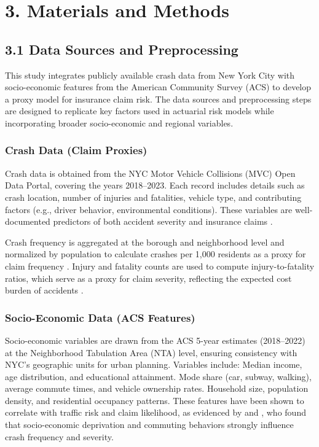 \documentclass[
  number,
  review,
  3p]{elsarticle}
\begin{document}
\section{3. Materials and Methods}\label{materials-and-methods}

\subsection{\texorpdfstring{\textbf{3.1 Data Sources and
Preprocessing}}{3.1 Data Sources and Preprocessing}}\label{data-sources-and-preprocessing}

This study integrates publicly available crash data from New York City
with socio-economic features from the American Community Survey (ACS) to
develop a proxy model for insurance claim risk. The data sources and
preprocessing steps are designed to replicate key factors used in
actuarial risk models while incorporating broader socio-economic and
regional variables.

\subsubsection{\texorpdfstring{\textbf{Crash Data (Claim
Proxies)}}{Crash Data (Claim Proxies)}}\label{crash-data-claim-proxies}

Crash data is obtained from the NYC Motor Vehicle Collisions (MVC) Open
Data Portal, covering the years 2018--2023. Each record includes details
such as crash location, number of injuries and fatalities, vehicle type,
and contributing factors (e.g., driver behavior, environmental
conditions). These variables are well-documented predictors of both
accident severity and insurance claims \citep[\citep{dong}]{adeniyi}.

Crash frequency is aggregated at the borough and neighborhood level and
normalized by population to calculate crashes per 1,000 residents as a
proxy for claim frequency \citep{brubacher}. Injury and fatality counts
are used to compute injury-to-fatality ratios, which serve as a proxy
for claim severity, reflecting the expected cost burden of accidents
\citep{clemente}.

\subsubsection{\texorpdfstring{\textbf{Socio-Economic Data (ACS
Features)}}{Socio-Economic Data (ACS Features)}}\label{socio-economic-data-acs-features}

Socio-economic variables are drawn from the ACS 5-year estimates
(2018--2022) at the Neighborhood Tabulation Area (NTA) level, ensuring
consistency with NYC's geographic units for urban planning. Variables
include: Median income, age distribution, and educational attainment.
Mode share (car, subway, walking), average commute times, and vehicle
ownership rates. Household size, population density, and residential
occupancy patterns. These features have been shown to correlate with
traffic risk and claim likelihood, as evidenced by \citep{brubacher} and
\citep{cabrera}, who found that socio-economic deprivation and commuting
behaviors strongly influence crash frequency and severity.
\end{document}

